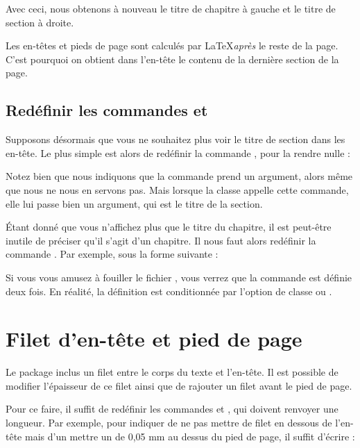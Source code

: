 Avec ceci, nous obtenons à nouveau le titre de chapitre à gauche et le titre de section à droite.

\begin{attention}
Les en-têtes et pieds de page sont calculés par \LaTeX \emph{après} le reste de la page. C'est pourquoi on obtient dans l'en-tête le contenu de la dernière section de la page.
\end{attention}

\subsection{Redéfinir les commandes  et }

Supposons désormais que vous ne souhaitez plus voir le titre de section dans les en-tête. Le plus simple est alors de redéfinir la commande , pour la rendre nulle :

\begin{latexcode}
\renewcommand{\sectionmark}[1]{}
\end{latexcode}

\begin{attention}
Notez bien que nous indiquons que la commande  prend un argument, alors même que nous ne nous en servons pas. Mais lorsque la classe  appelle cette commande, elle lui passe bien un argument, qui est le titre de la section.
\end{attention}

Étant donné que vous n'affichez plus que le titre du chapitre, il est peut-être inutile de préciser qu'il s'agit d'un chapitre. Il nous faut alors redéfinir la commande . Par exemple, sous la forme suivante :

\begin{latexcode}
\renewcommand{\chaptermark}[1]{\markboth {\MakeUppercase{\thechapter #1}}{}}
\end{latexcode}


\begin{plusloins}
Si vous vous amusez à fouiller le fichier , vous verrez que la commande  est définie deux fois. En réalité, la définition est conditionnée par l'option de classe  ou .
\end{plusloins}
\section{Filet d'en-tête et pied de page}

Le package  inclus un filet entre le corps du texte et l'en-tête. Il est possible de modifier l'épaisseur de ce filet ainsi que de rajouter un filet avant le  pied de page.

Pour ce faire, il suffit de redéfinir les commandes  et , qui doivent renvoyer une longueur.
Par exemple, pour indiquer de ne pas mettre de filet en dessous de l'en-tête mais d'un mettre un de 0,05 mm au  dessus du pied de page, il suffit d'écrire : 
\begin{latexcode}
\renewcommand{\headrulewidth}[0]{0pt}
\renewcommand{\footrulewidth}[0]{0.05mm}
\end{latexcode}

